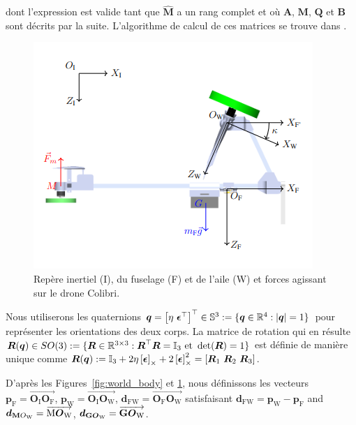 dont l'expression est valide tant que $\hat{\boldsymbol{M}}$ a un rang complet et où $\boldsymbol{A}$, $\boldsymbol{M}$, $\boldsymbol{Q}$ et $\boldsymbol{B}$ sont décrits par la suite. L'algorithme de calcul de ces matrices se trouve dans \cite{udwadia-schutte}.

\begin{figure}[ht!]
    \centering
    \includegraphics[width=0.6\columnwidth,angle=0,trim={0 0 0 0.5cm},clip]{figures/fram_side_colibri.png}
    \caption{Repère inertiel (I), du fuselage (F) et de l'aile (W) et forces agissant sur le drone Colibri.}
    \label{fig:colibri_frame_side}
\end{figure}
Nous utiliserons les quaternions $\boldsymbol{q} = \left[ \eta ~ \boldsymbol{\epsilon}^\top \right]^\top  \in {\mathbb S}^3:=\{ \boldsymbol{q}\in {\mathbb R}^4: |\boldsymbol{q}| = 1\}$ pour représenter les orientations des deux corps. La matrice de rotation qui en résulte $\boldsymbol{R}(\boldsymbol{q}) \in SO(3): = \{\boldsymbol{R}\in {\mathbb R}^{3\times 3}: \boldsymbol{R}^\top \boldsymbol{R} = \mathbb{I}_{3} \text{ et}~\det(\boldsymbol{R})=1\}$ est définie de manière unique comme $\boldsymbol{R}(\boldsymbol{q}) := \mathbb{I}_{3} +2\eta \left[\boldsymbol{\epsilon}\right]_{\times} + 2\left[\boldsymbol{\epsilon}\right]_{\times}^{2} = [\boldsymbol{R}_{1}~\boldsymbol{R}_{2}~\boldsymbol{R}_{3}]$.

D'après les Figures~\ref{fig:world_body} et \ref{fig:colibri_frame_side}, nous définissons les vecteurs $\boldsymbol{p}_{\text{F}} = \overrightarrow{\boldsymbol{O}_{\text{I}} \boldsymbol{O}_{\text{F}}} $, $\boldsymbol{p}_{\text{W}} = \overrightarrow{\boldsymbol{O}_{\text{I}} \boldsymbol{O}_{\text{W}}} $, $\boldsymbol{d}_{\text{FW}} = \overrightarrow{\boldsymbol{O}_{\text{F}} \boldsymbol{O}_{\text{W}}} $ satisfaisant $\boldsymbol{d}_{\text{FW}} = \boldsymbol{p}_{\text{W}} - \boldsymbol{p}_{\text{F}}$ and $\boldsymbol{d}_{\text{\textbf{M}}O_{\text{W}}} = \overrightarrow{\text{M} \boldsymbol{O}_{\text{W}} }$, $\boldsymbol{d}_{\text{\textbf{G}}\boldsymbol{O}_{\text{W}}} = \overrightarrow{\text{\textbf{G}} \boldsymbol{O}_{\text{W}} }$.

